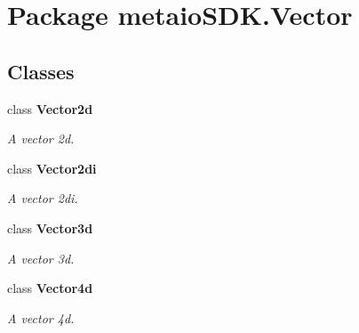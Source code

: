 \section{Package metaio\-S\-D\-K.\-Vector}
\label{namespacemetaio_s_d_k_1_1_vector}
\subsection*{Classes}
\begin{DoxyCompactItemize}
\item 
class {\bf Vector2d}
\begin{DoxyCompactList}\small\item\em A vector 2d. \end{DoxyCompactList}\item 
class {\bf Vector2di}
\begin{DoxyCompactList}\small\item\em A vector 2di. \end{DoxyCompactList}\item 
class {\bf Vector3d}
\begin{DoxyCompactList}\small\item\em A vector 3d. \end{DoxyCompactList}\item 
class {\bf Vector4d}
\begin{DoxyCompactList}\small\item\em A vector 4d. \end{DoxyCompactList}\end{DoxyCompactItemize}
